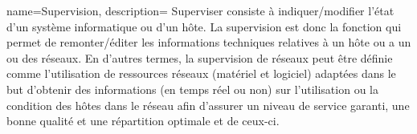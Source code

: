 {
name=Supervision,
description={
Superviser consiste à indiquer/modifier l'état d'un système informatique ou d'un hôte. La supervision  est donc la fonction qui permet de remonter/éditer les informations techniques relatives à un hôte ou a un ou des réseaux. En d'autres termes, la supervision de réseaux peut être définie comme l'utilisation de ressources réseaux (matériel et logiciel) adaptées dans le but d'obtenir des informations (en temps réel ou non) sur l'utilisation ou la condition des hôtes dans le réseau  afin d'assurer un niveau de service garanti, une bonne qualité et une répartition optimale et de ceux-ci.}
}